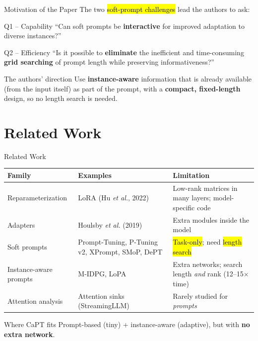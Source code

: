 \documentclass[aspectratio=169,11pt]{beamer}
\begin{document}
\begin{frame}{Motivation of the Paper}
\small The two \hl{soft-prompt challenges} lead the authors to ask:\par\vspace{6pt}
\begin{block}{Q1 \;--\; Capability}
``Can soft prompts be \textbf{interactive} for improved adaptation to diverse instances?''
\end{block}
\vspace{4pt}
\begin{block}{Q2 \;--\; Efficiency}
``Is it possible to \textbf{eliminate} the inefficient and time-consuming \textbf{grid searching} of prompt length while preserving informativeness?''
\end{block}
\vspace{4pt}
\begin{exampleblock}{The authors' direction}
Use \textbf{instance-aware} information that is already available (from the input itself) as part of the prompt,
with a \textbf{compact, fixed-length} design, so no length search is needed.
\end{exampleblock}
\end{frame}

\section{Related Work}

\begin{frame}{Related Work}
\centering\small
\renewcommand{\arraystretch}{1.25}
\begin{tabular}{@{}p{3.1cm}p{4.9cm}p{5.4cm}@{}}
\toprule
\textbf{Family} & \textbf{Examples} & \textbf{Limitation} \\
\midrule
Reparameterization & LoRA (Hu \textit{et al.}, 2022) & Low-rank matrices in many layers; model-specific code \\
Adapters & Houlsby \textit{et al.} (2019) & Extra modules inside the model \\
Soft prompts & Prompt-Tuning, P-Tuning v2, XPrompt, SMoP, DePT & \hl{Task-only}; need \hl{length search} \\
Instance-aware prompts & M-IDPG, LoPA & Extra networks; search length \emph{and} rank (12--15$\times$ time) \\
Attention analysis & Attention sinks (StreamingLLM) & Rarely studied for \emph{prompts} \\
\bottomrule
\end{tabular}

\vspace{10pt}
\begin{block}{Where CaPT fits}
Prompt-based (tiny) + instance-aware (adaptive), but with \textbf{no extra network}.
\end{block}
\end{frame}
\end{document}

